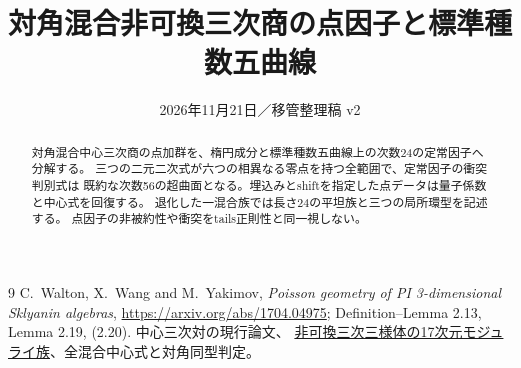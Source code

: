 \documentclass[11pt,a4paper]{ltjsarticle}
\title{対角混合非可換三次商の点因子と標準種数五曲線}
\author{}
\date{2026年11月21日／移管整理稿 v2}
\begin{document}
\maketitle
\begin{abstract}
対角混合中心三次商の点加群を、楕円成分と標準種数五曲線上の次数24の定常因子へ分解する。
三つの二元二次式が六つの相異なる零点を持つ全範囲で、定常因子の衝突判別式は
既約な次数56の超曲面となる。埋込みとshiftを指定した点データは量子係数と中心式を回復する。
退化した一混合族では長さ24の平坦族と三つの局所環型を記述する。
点因子の非被約性や衝突をtails正則性と同一視しない。
\end{abstract}


\begin{thebibliography}{9}
 C.~Walton, X.~Wang and M.~Yakimov,
\emph{Poisson geometry of PI 3-dimensional Sklyanin algebras},
\url{https://arxiv.org/abs/1704.04975}; Definition--Lemma 2.13, Lemma 2.19, (2.20).
 中心三次対の現行論文、
\href{https://github.com/uedakazushi/nc-cubic-threefold/blob/main/papers/nc-cubic-threefold.tex}
{非可換三次三様体の17次元モジュライ族}、全混合中心式と対角同型判定。
\end{thebibliography}
\end{document}
